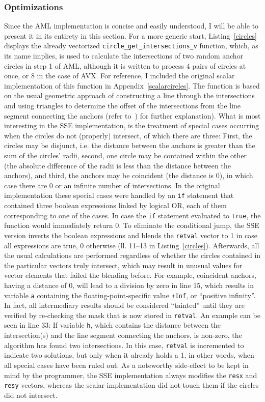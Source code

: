 \subsubsection{Optimizations}
Since the AML implementation is concise and easily understood, I will be able to present it in its entirety in this section. For a more generic start, Listing~\ref{circles} displays the already vectorized \texttt{circle\_get\_intersections\_v} function, which, as its name implies, is used to calculate the intersections of two random anchor circles in step 1 of AML, although it is written to process 4 pairs of circles at once, or 8 in the case of AVX. For reference, I included the original scalar implementation of this function in Appendix~\ref{scalarcircles}. The function is based on the usual geometric approach of constructing a line through the intersections and using triangles to determine the offset of the intersections from the line segment connecting the anchors (refer to~\cite{bourke1997circles}) for further explanation). What is most interesting in the SSE implementation, is the treatment of special cases occurring when the circles do not (properly) intersect, of which there are three: First, the circles may be disjunct, i.e. the distance between the anchors is greater than the sum of the circles' radii, second, one circle may be contained within the other (the absolute difference of the radii is less than the distance between the anchors), and third, the anchors may be coincident (the distance is 0), in which case there are 0 or an infinite number of intersections. In the original implementation these special cases were handled by an \texttt{if} statement that contained three boolean expressions linked by logical OR, each of them corresponding to one of the cases. In case the \texttt{if} statement evaluated to \texttt{true}, the function would immediately return 0. To eliminate the conditional jump, the SSE version inverts the boolean expressions and blends the \texttt{retval} vector to 1 in case all expressions are true, 0 otherwise (ll. 11--13 in Listing~\ref{circles}). Afterwards, all the usual calculations are performed regardless of whether the circles contained in the particular vectors truly intersect, which may result in unusual values for vector elements that failed the blending before. For example, coincident anchors, having a distance of 0, will lead to a division by zero in line 15, which results in variable \texttt{a} containing the floating-point-specific value \texttt{+Inf}, or ``positive infinity''. In fact, all intermediary results should be considered ``tainted'' until they are verified by re-checking the mask that is now stored in \texttt{retval}. An example can be seen in line 33: If variable \texttt{h}, which contains the distance between the intersection(s) and the line segment connecting the anchors, is non-zero, the algorithm has found two intersections. In this case, \texttt{retval} is incremented to indicate two solutions, but only when it already holds a 1, in other words, when all special cases have been ruled out. As a noteworthy side-effect to be kept in mind by the programmer, the SSE implementation always modifies the \texttt{resx} and \texttt{resy} vectors, whereas the scalar implementation did not touch them if the circles did not intersect.


